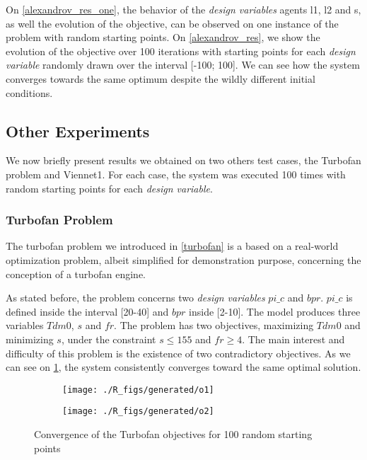 On \figurename \ref{alexandrov_res_one}, the behavior of the \emph{design variables} agents l1, l2 and s, as well the evolution of the objective, can be observed on one instance of the problem with random starting points. On \figurename \ref{alexandrov_res}, we show the evolution of the objective over 100 iterations with  starting points  for each \emph{design variable} randomly drawn over the interval [-100; 100]. We can see how the system converges towards the same optimum despite the wildly different initial conditions.

\subsection{Other Experiments}

We now briefly present results we obtained on two others test cases, the Turbofan problem and Viennet1. For each case, the system was executed 100 times with random starting points for each \emph{design variable}.

\subsubsection{Turbofan Problem}

The turbofan problem we introduced in \figurename \ref{turbofan} is a based on a real-world optimization problem, albeit simplified for demonstration purpose, concerning the conception of a turbofan engine.

As stated before, the problem concerns two \emph{design variables} $pi\_c$ and $bpr$. $pi\_c$ is defined inside the interval [20-40] and $bpr$ inside [2-10]. The model produces three variables $Tdm0$, $s$ and $fr$.
The problem has two objectives, maximizing  $Tdm0$ and minimizing $s$, under the constraint \(s \leq 155\) and \(fr \geq 4\).
The main interest and difficulty of this problem is the existence of two contradictory objectives.
As we can see on \figurename \ref{snecma_res}, the system consistently converges toward the same optimal solution.

\begin{figure}[h]
	\begin{subfigure}[b]{0.49\textwidth}
		\centering
		\texttt{[image: ./R\_figs/generated/o1]}	
	\end{subfigure}
	\hfill%
	\begin{subfigure}[b]{0.49\textwidth}
		\centering
		\texttt{[image: ./R\_figs/generated/o2]}	
	\end{subfigure}
	\caption{Convergence of the Turbofan objectives for 100 random starting points}
	\label{snecma_res}
\end{figure}

